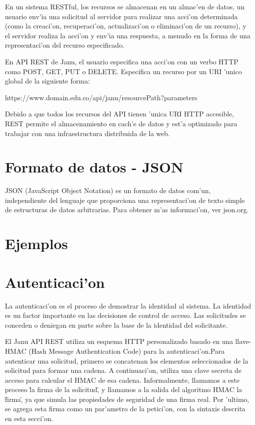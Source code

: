 En un sistema RESTful, los recursos se almacenan en un almac'en de datos, un usuario env'ia una solicitud al servidor para realizar una acci'on determinada (como la creaci'on, recuperaci'on, actualizaci'on o eliminaci'on de un recurso), y el servidor realiza la acci'on y env'ia una respuesta, a menudo en la forma de una representaci'on del recurso especificado.


En API REST de Janu, el usuario especifica una acci'on con un verbo HTTP como POST, GET, PUT o DELETE. Especifica un recurso por un URI 'unico global de la siguiente forma:

https://www.domain.edu.co/api/janu/resourcePath?parameters

Debido a que todos los recursos del API tienen 'unica URI HTTP accesible, REST permite el almacenamiento en cach'e de datos y est'a optimizado para trabajar con una infraestructura distribuida de la web.

\section{Formato de datos - JSON}
JSON (JavaScript Object Notation) es un formato de datos com'un, independiente del lenguaje que proporciona una representaci'on de texto simple de estructuras de datos arbitrarias. Para obtener m'as informaci'on, ver json.org.

\section{Ejemplos}


\section{Autenticaci'on}

La autenticaci'on es el proceso de demostrar la identidad al sistema. La identidad es un factor importante en las decisiones de control de acceso. Las solicitudes se conceden o deniegan en parte sobre la base de la identidad del solicitante.

El Janu API REST utiliza un esquema HTTP personalizado basado en una llave-HMAC (Hash Message Authentication Code) para la autenticaci'on.Para autenticar una solicitud, primero se concatenan los elementos seleccionados de la solicitud para formar una cadena. A continuaci'on, utiliza una clave secreta de acceso para calcular el HMAC de esa cadena. Informalmente, llamamos a este proceso \"la firma de la solicitud\", y llamamos a la salida del algoritmo HMAC la \"firma\", ya que simula las propiedades de seguridad de una firma real. Por 'ultimo, se agrega esta firma como un par'ametro de la petici'on, con la sintaxis descrita en esta secci'on.


